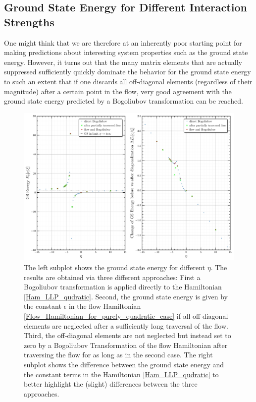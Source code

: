 \subsection{Ground State Energy for Different Interaction Strengths}
One might think that we are therefore at an inherently poor starting point for making predictions about interesting system properties such as the ground state energy. However, it turns out that the many matrix elements that are actually suppressed sufficiently quickly dominate the behavior for the ground state energy to such an extent that if one discards all off-diagonal elements (regardless of their magnitude) after a certain point in the flow, very good agreement with the ground state energy predicted by a Bogoliubov transformation can be reached.
\begin{figure}[H]
    \centering
    \includegraphics[width=\textwidth]{figures/plots/PDF/GS_energies_bog_flow_comp.pdf}
    \caption[Ground state energy of Bose Polaron for different $\eta$]{The left subplot shows the ground state energy for different $\eta$. The results are obtained via three different approaches: First a Bogoliubov transformation is applied directly to the Hamiltonian \ref{Ham_LLP_qudratic}. Second, the ground state energy is given by the constant $\epsilon$ in the flow Hamiltonian \ref{Flow_Hamiltonian_for_purely_quadratic_case} if all off-diagonal elements are neglected after a sufficiently long traversal of the flow. Third, the off-diagonal elements are not neglected but instead set to zero by a Bogoliubov Transformation of the flow Hamiltonian after traversing the flow for as long as in the second case.
The right subplot shows the difference between the ground state energy and the constant terms in the Hamiltonian \ref{Ham_LLP_qudratic} to better highlight the (slight) differences between the three approaches.\\
}
    \label{GSenergiesBogFlow}
\end{figure}
